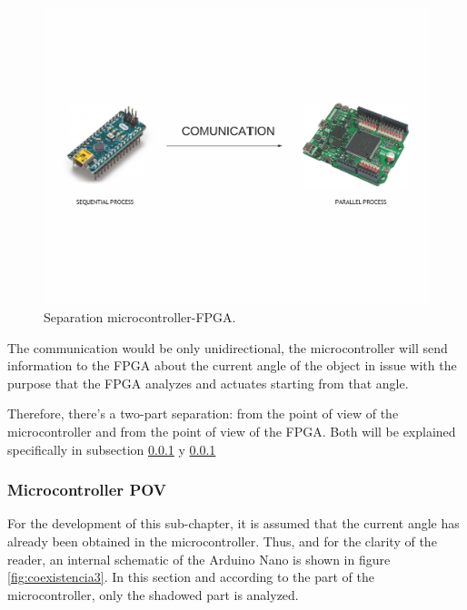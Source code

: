 \begin{figure}[H]
	\center
	\includegraphics[trim = 0mm 40mm 0mm 20mm, clip,scale=0.4]{imagenes/Balancing_robot/coexistencia1.pdf}
	\caption{Separation microcontroller-FPGA.}
	\label{fig:coexistencia1}
\end{figure}

The communication would be only unidirectional, the microcontroller will send information to the FPGA about the current angle of the object in issue with the purpose that the FPGA analyzes and actuates starting from that angle.\newline

Therefore, there’s a two-part separation: from the point of view of the microcontroller and from the point of view of the FPGA. Both will be explained specifically in subsection \ref{sec:vista_controlador} y \ref{sec:vista_controlador}

\subsubsection{Microcontroller POV}  \label{sec:vista_controlador}

For the development of this sub-chapter, it is assumed that the current angle has already been obtained in the microcontroller. Thus, and for the clarity of the reader, an internal schematic of the Arduino Nano is shown in figure \ref{fig:coexistencia3}. In this section and according to the part of the microcontroller, only the shadowed part is analyzed. 

